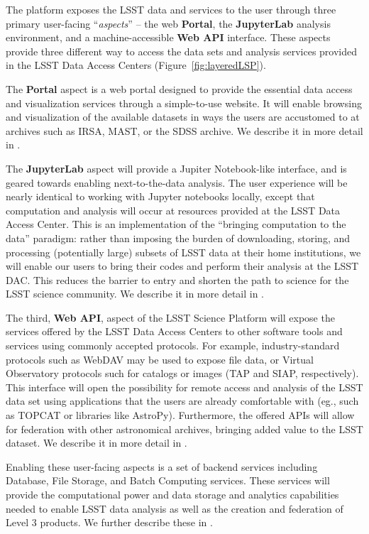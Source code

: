 \documentclass[DM,lsstdraft,toc]{lsstdoc}
\begin{document}
The platform exposes the LSST data
and services to the user through three primary user-facing ``{\it aspects}'' -- the web {\bf Portal},
the {\bf JupyterLab} analysis environment, and a machine-accessible {\bf Web API} interface. These aspects provide three different way to access the data sets and analysis services provided in the LSST Data Access Centers (Figure~\ref{fig:layeredLSP}).

The {\bf Portal} aspect is a web portal designed to provide the essential data
access and visualization services through a simple-to-use website.  It will
enable browsing and visualization of the available datasets in ways the
users are accustomed to at archives such as IRSA, MAST, or the SDSS archive.
We describe it in more detail in .

The {\bf JupyterLab} aspect will provide a Jupiter Notebook-like interface, and 
is geared towards enabling next-to-the-data analysis. The user experience will 
be nearly identical to working with Jupyter notebooks locally, except that computation
and analysis will occur at resources provided at the LSST Data Access Center.  This is an
implementation of the “bringing computation to the data” paradigm: rather
than imposing the burden of downloading, storing, and processing (potentially large)
subsets of LSST data at their home institutions, we will enable our users to
bring their codes and perform their analysis at the LSST DAC.
This reduces the barrier to entry and shorten the path to science for
the LSST science community. We describe it in more detail in .

The third, {\bf Web API}, aspect of the LSST Science Platform will expose the
services offered by the LSST Data Access Centers to other software tools and
services using commonly accepted protocols. For example, industry-standard
protocols such as WebDAV may be used to expose file data, or Virtual Observatory
protocols such for catalogs or images (TAP and SIAP, respectively). This interface will open the
possibility for remote access and analysis of the LSST  data set using
applications that the users are already comfortable with (eg., such as TOPCAT 
or libraries like AstroPy). Furthermore, the offered APIs will allow for federation
with other astronomical archives, bringing added value to the LSST dataset.
We describe it in more detail in .

Enabling these user-facing aspects is a set of backend services including
Database, File Storage, and Batch Computing services. These services will provide
the computational power and data storage and analytics capabilities needed to
enable LSST data analysis as well as the creation and federation of Level 3 products.
We further describe these in .
\end{document}
